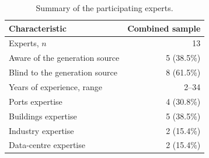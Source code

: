 \begin{table}[htbp]
\caption{Summary of the participating experts.}
\label{tab:expert_profile}
\begin{tabular}{lr}
\toprule
Characteristic & Combined sample \\
\midrule
Experts, $n$ & 13 \\
Aware of the generation source & 5 (38.5\%) \\
Blind to the generation source & 8 (61.5\%) \\
Years of experience, range & 2--34 \\
Ports expertise & 4 (30.8\%) \\
Buildings expertise & 5 (38.5\%) \\
Industry expertise & 2 (15.4\%) \\
Data-centre expertise & 2 (15.4\%) \\
\bottomrule
\end{tabular}
\end{table}
